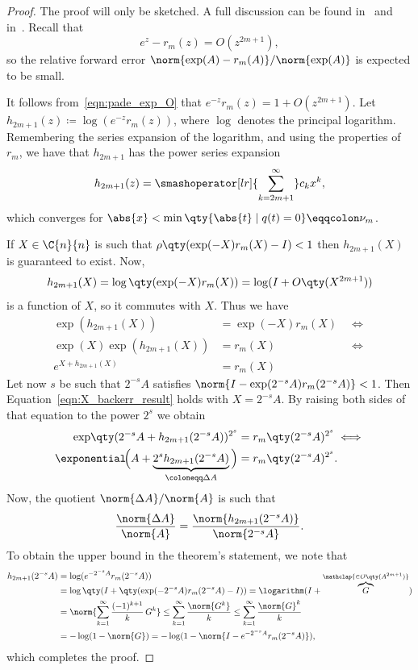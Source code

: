 \begin{proof}
	The proof will only be sketched. A full discussion can be found in~\cite[§~10.3]{higham:matfun_book} and in~\cite{higham:SaS_revisited}. 
	Recall that 
	\begin{equation}\label{eqn:pade_exp_O}
		e^{z}-r_m(z)=O(z^{2m+1}),
	\end{equation}
	so the relative forward error $\norm{\exp(A)-r_m(A)}/\norm{\exp(A)}$ is expected to be small. 
	
	It follows from~\eqref{eqn:pade_exp_O} that $e^{-z}r_m(z) = 1 + O(z^{2m+1})$. Let 
	$h_{2m+1}(z)\coloneqq\log(e^{-z}r_m(z))$, where $\log$ denotes the principal logarithm.
	Remembering the series expansion of the logarithm, and using the properties of $r_m$, we have that 
	$h_{2m+1}$ has the power series expansion
	\[
		h_{2m+1}(z)=\smashoperator[lr]{\sum_{k=2m+1}^{\infty}}c_{k}x^k,
	\]
	which converges for $\abs{x}<\min\qty{\abs{t}\mid q(t)=0}\eqqcolon\nu_m$.
	
	If $X\in\C{n}{n}$ is such that $\rho\qty(\exp(-X)r_m(X)-I)<1$ then $h_{2m+1}(X)$ is guaranteed to exist. Now, 
	\[h_{2m+1}(X)=\log\qty(\exp(-X)r_m(X))=\log(I+O\qty(X^{2m+1}))\]
	is a function of $X$, so it commutes with $X$. Thus we have
	\begin{align}\label{eqn:X_backerr_result}
		\exp(h_{2m+1}(X))&=\exp(-X)r_m(X) \quad\iff\nonumber\\
		\exp(X)\exp(h_{2m+1}(X))&=r_m(X)\phantom{\exp(-X)} \quad\iff \nonumber\\
		e^{X+h_{2m+1}(X)} &=r_m(X) 
	\end{align}
	Let now $s$ be such that $2^{-s}A$ satisfies $\norm{I-\exp(2^{-s}A)r_m(2^{-s}A)}<1$. Then Equation~\eqref{eqn:X_backerr_result} holds with $X=2^{-s}A$. By raising both sides of that equation to the power $2^s$ we obtain
	\begin{align}\label{eqn:A_backerr_result}
		\exp\!\qty(2^{-s}A+h_{2m+1}(2^{-s}A))^{2^s}&=r_m\qty(2^{-s}A)^{2^s} \iff\nonumber\\
		\exponential\!\Big(A+\underbrace{2^sh_{2m+1}(2^{-s}A)}_{\coloneqq\Delta{A}}\Big)&=r_m\qty(2^{-s}A)^{2^s}.
	\end{align}
	Now, the quotient $\norm{\Delta{A}}/\norm{A}$ is such that
	\begin{equation}\label{eqn:backerr_h_m}
		\frac{\norm{\Delta{A}}}{\norm{A}}=\frac{\norm{h_{2m+1}(2^{-s}A)}}{\norm{2^{-s}A}}.
	\end{equation}
	To obtain the upper bound in the theorem's statement, we note that 
	\begin{align*}
		h_{2m+1}(2^{-s}A) &= \log(e^{-2^{-s}A}r_m(2^{-s}A)) \\[-1.5em]
		 &= \log\qty(I + \qty(\exp(-2^{-s}A)r_m(2^{-s}A) - I)) = \logarithm(I+\overbrace{G}^{\mathclap{\in O\qty(A^{2m+1})}})\\
		 &= \norm{\sum_{k=1}^{\infty}\frac{(-1)^{k+1}}{k}\,G^k}\le\sum_{k=1}^{\infty}\frac{\norm{G^k}}{k}\le\sum_{k=1}^{\infty}\frac{\norm{G}^k}{k}\\
		 &= -\log(1-\norm{G})= -\log(1-\norm{I-e^{-2^{-s}A}r_m(2^{-s}A)}),
	\end{align*}
	which completes the proof.
\end{proof}
